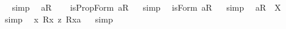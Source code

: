 \begin{isabellebody}
\isadelimproof
\ %
\endisadelimproof
%
\isatagproof
{}\isamarkupfalse%
\ {\isacharparenleft}simp{\isacharparenright}\ \isamarkupfalse%
%
\endisatagproof
{\isafoldproof}%
%
\isadelimproof
%
\endisadelimproof
\isanewline
\isanewline
{}\isamarkupfalse%
\ {\isachardoublequoteopen}{\isacharbrackleft}{\isacharless}a{\isasymcirc}R{}{\isachargreater}{\isacharbrackright}{\isachardoublequoteclose}\ \isamarkupfalse%
%
\isadelimproof
\ %
\endisadelimproof
%
\isatagproof
{}\isamarkupfalse%
%
\endisatagproof
{\isafoldproof}%
%
\isadelimproof
%
\endisadelimproof
\isanewline
{}\isamarkupfalse%
\ {\isachardoublequoteopen}isPropForm\ {\isacharless}a{\isasymcirc}R{}{\isachargreater}{\isachardoublequoteclose}%
\isadelimproof
\ %
\endisadelimproof
%
\isatagproof
{}\isamarkupfalse%
\ {\isacharparenleft}simp{\isacharparenright}\ \isamarkupfalse%
%
\endisatagproof
{\isafoldproof}%
%
\isadelimproof
%
\endisadelimproof
\isanewline
{}\isamarkupfalse%
\ {\isachardoublequoteopen}isForm\ {\isacharless}a{\isasymcirc}R{}{\isachargreater}{\isachardoublequoteclose}%
\isadelimproof
\ %
\endisadelimproof
%
\isatagproof
{}\isamarkupfalse%
\ {\isacharparenleft}simp{\isacharparenright}\ \isamarkupfalse%
%
\endisatagproof
{\isafoldproof}%
%
\isadelimproof
%
\endisadelimproof
\isanewline
{}\isamarkupfalse%
\ {\isachardoublequoteopen}{\isacharless}a{\isasymcirc}R{}{\isachargreater}\ {\isacharequal}\ X{\isachardoublequoteclose}%
\isadelimproof
\ %
\endisadelimproof
%
\isatagproof
{}\isamarkupfalse%
\ {\isacharparenleft}simp{\isacharparenright}\ \isamarkupfalse%
%
\endisatagproof
{\isafoldproof}%
%
\isadelimproof
%
\endisadelimproof
\isanewline
\isanewline
{}\isamarkupfalse%
\ {\isachardoublequoteopen}{\isacharbrackleft}{\isacharless}{\isasymlambda}x{\isachardot}\ {\isacharless}R{}{\isasymbullet}{\isachardot}x{\isachardot}{\isachargreater}\ {\isasymrightarrow}\isactrlsup z\ {\isacharless}R{}{\isasymbullet}{\isachardot}x{\isachardot}{\isachargreater}{\isacharparenright}{\isasymbullet}a{\isachargreater}{\isacharbrackright}{\isachardoublequoteclose}%
\isadelimproof
\ %
\endisadelimproof
%
\isatagproof
{}\isamarkupfalse%
\ {\isacharparenleft}simp{\isacharparenright}\ \isamarkupfalse%
%
\endisatagproof

\end{isabellebody}
